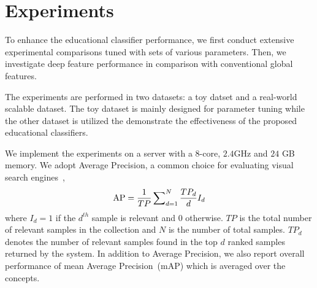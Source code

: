 \documentclass[11pt,twocolumn,twoside]{IEEEtran}
\begin{document}

\section{Experiments}
To enhance the educational classifier performance, we first conduct extensive experimental comparisons tuned with sets of various parameters. Then, we investigate deep feature performance in comparison with conventional global features.

The experiments are performed in two datasets: a toy datset and a real-world scalable dataset. The toy dataset is mainly designed for parameter tuning while the other dataset is utilized the demonstrate the
effectiveness of the proposed educational classifiers.

We implement the experiments on a server
with a $8$-core, $2.4$GHz and $24$ GB memory. We adopt Average Precision, a common choice for evaluating
visual search engines~\cite{TRECVID07}\cite{Michele_TMM13},
\begin{equation}
{\rm{AP}} = \frac{1}{{TP}}\sum\nolimits_{d = 1}^N {\frac{{T{P_d}}}{d}} {I_d}
\end{equation}
where $I_{d} = 1$ if the $d^{th}$ sample is relevant and $0$ otherwise. $TP$ is the total number of relevant samples in the collection and $N$ is the number of total samples. $TP_{d}$ denotes the number of relevant samples
found in the top $d$ ranked samples returned by the system. In addition to Average Precision, we also report overall performance of mean Average Precision~(mAP) which is averaged over the concepts.
\end{document}
